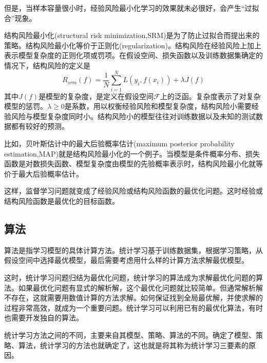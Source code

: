 但是，当样本容量很小时，经验风险最小化学习的效果就未必很好，会产生“过拟合”现象。

结构风险最小化(structural risk minimization,SRM)是为了防止过拟合而提出来的策略。结构风险最小化等价于正则化(regularization)。结构风险在经验风险上加上表示模型复杂度的正则化项或罚项。在假设空间、损失函数以及训练数据集确定的情况下，结构风险的定义是
\begin{equation}
	R_{srm}(f)=\frac{1}{N}\sum_{i=1}^{N}L(y_i,f(x_i))+\lambda J(f)
\end{equation}
其中$J(f)$是模型的复杂度，是定义在假设空间$\mathcal{F}$上的泛函。复杂度表示了对复杂模型的惩罚。$\lambda\geq 0$是系数，用以权衡经验风险和模型复杂度，结构风险小需要经验风险与模型复杂度同时小。结构风险小的模型往往对训练数据以及未知的测试数据都有较好的预测。

比如，贝叶斯估计中的最大后验概率估计(maximum posterior probability estimation,MAP)就是结构风险最小化的一个例子。当模型是条件概率分布、损失函数是对数损失函数、模型复杂度由模型的先验概率表示时，结构风险最小化就等价于最大后验概率估计。

这样，监督学习问题就变成了经验风险或结构风险函数的最优化问题。这时经验或结构风险函数是最优化的目标函数。
\subsection*{算法}
算法是指学习模型的具体计算方法。统计学习基于训练数据集，根据学习策略，从假设空间中选择最优模型，最后需要考虑用什么样的计算方法求解最优模型。

这时，统计学习问题归结为最优化问题，统计学习的算法成为求解最优化问题的算法。如果最优化问题有显式的解析解，这个最优化问题就比较简单。但通常解析解不存在，这就需要用数值计算的方法求解。如何保证找到全局最优解，并使求解的过程非常高效，就成为一个重要问题。统计学习可以利用已有的最优化算法，有时也需要开发独自的算法。

统计学习方法之间的不同，主要来自其模型、策略、算法的不同。确定了模型、策略、算法，统计学习的方法也就确定了，这也就是将其称为统计学习三要素的原因。
